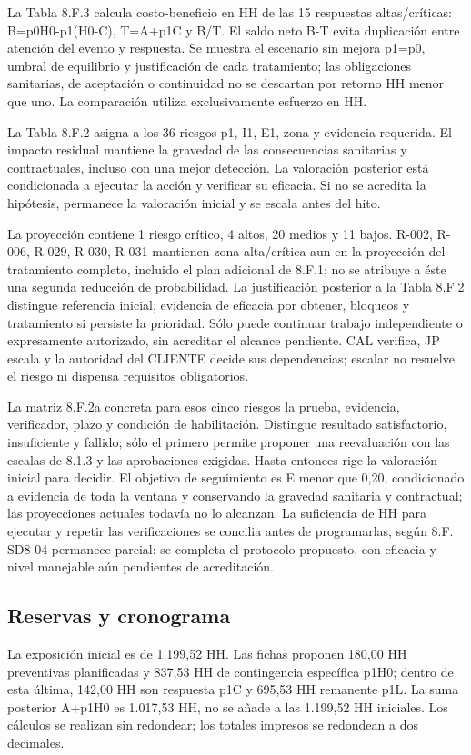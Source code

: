 La Tabla 8.F.3 calcula costo-beneficio en HH de las 15 respuestas altas/críticas: B=p0H0-p1(H0-C), T=A+p1C y B/T. El saldo neto B-T evita duplicación entre atención del evento y respuesta. Se muestra el escenario sin mejora p1=p0, umbral de equilibrio y justificación de cada tratamiento; las obligaciones sanitarias, de aceptación o continuidad no se descartan por retorno HH menor que uno. La comparación utiliza exclusivamente esfuerzo en HH.

La Tabla 8.F.2 asigna a los 36 riesgos p1, I1, E1, zona y evidencia requerida. El impacto residual mantiene la gravedad de las consecuencias sanitarias y contractuales, incluso con una mejor detección. La valoración posterior está condicionada a ejecutar la acción y verificar su eficacia. Si no se acredita la hipótesis, permanece la valoración inicial y se escala antes del hito.

La proyección contiene 1 riesgo crítico, 4 altos, 20 medios y 11 bajos. R-002, R-006, R-029, R-030, R-031 mantienen zona alta/crítica aun en la proyección del tratamiento completo, incluido el plan adicional de 8.F.1; no se atribuye a éste una segunda reducción de probabilidad. La justificación posterior a la Tabla 8.F.2 distingue referencia inicial, evidencia de eficacia por obtener, bloqueos y tratamiento si persiste la prioridad. Sólo puede continuar trabajo independiente o expresamente autorizado, sin acreditar el alcance pendiente. CAL verifica, JP escala y la autoridad del CLIENTE decide sus dependencias; escalar no resuelve el riesgo ni dispensa requisitos obligatorios.

La matriz 8.F.2a concreta para esos cinco riesgos la prueba, evidencia, verificador,
plazo y condición de habilitación. Distingue resultado satisfactorio, insuficiente
y fallido; sólo el primero permite proponer una reevaluación con las escalas de
8.1.3 y las aprobaciones exigidas. Hasta entonces rige la valoración inicial para
decidir. El objetivo de seguimiento es E menor que 0,20, condicionado a evidencia
de toda la ventana y conservando la gravedad sanitaria y contractual; las
proyecciones actuales todavía no lo alcanzan. La suficiencia de HH para ejecutar
y repetir las verificaciones se concilia antes de programarlas, según 8.F.
SD8-04 permanece parcial: se completa el protocolo propuesto, con eficacia y
nivel manejable aún pendientes de acreditación.

\subsection{Reservas y cronograma}
La exposición inicial es de 1.199,52 HH. Las fichas proponen 180,00 HH preventivas planificadas y 837,53 HH de contingencia específica p1H0; dentro de esta última, 142,00 HH son respuesta p1C y 695,53 HH remanente p1L. La suma posterior A+p1H0 es 1.017,53 HH, no se añade a las 1.199,52 HH iniciales. Los cálculos se realizan sin redondear; los totales impresos se redondean a dos decimales.


